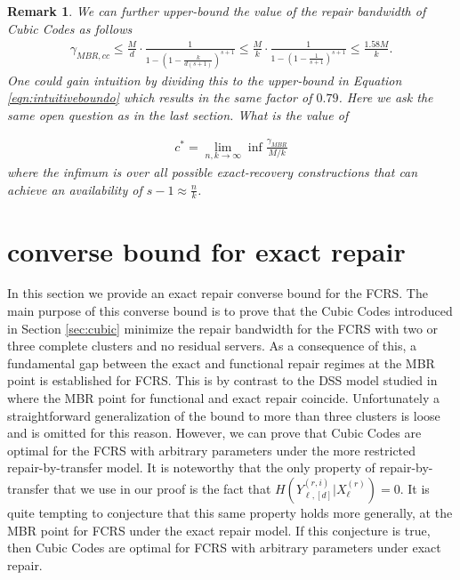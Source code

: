 \documentclass[journal,onecolumn,draftcls]{IEEEtran}
\newtheorem{rem}{Remark}
\begin{document}
\begin{rem}
We can further upper-bound the value of the repair bandwidth of Cubic Codes as follows\begin{eqnarray*}
\gamma_{MBR,cc} \le  \frac{M}{d}\cdot\frac{1}{1 - (1 - \frac{k}{d(s + 1)})^{s + 1}} \le \frac{M}{k}\cdot\frac{1}{1-(1-\frac{1}{s+1})^{s+1}}\le \frac{1.58M}{k}.
\end{eqnarray*}
One could gain intuition by dividing this to the upper-bound in Equation \eqref{eqn:intuitiveboundo} which results in the same factor of $0.79$. Here we ask the same open question as in the last section. What is the value of 

\begin{eqnarray*}
c^* = \lim_{n,k\rightarrow \infty}\inf  \frac{\gamma_{MBR}}{M/k}
\end{eqnarray*} 
where the infimum is over all possible exact-recovery constructions that can achieve an availability of $s -1 \approx \frac{n}{k}$.
\end{rem}

\section{ converse bound for exact repair}
\label{sec:converse}

In this section we provide an  exact repair converse bound for the FCRS. The main purpose of this converse bound is to prove that the Cubic Codes introduced in Section \ref{sec:cubic} minimize the repair bandwidth for the FCRS with two or three complete clusters and no residual servers. As a consequence of this, a fundamental gap between the exact and functional repair regimes at the MBR point is established for FCRS. This is by contrast to the DSS model studied in \cite{dimakis2010network} where the MBR point for functional and exact repair coincide.
Unfortunately a straightforward generalization of the bound to more than three clusters is loose and is omitted for this reason. However, we can prove that Cubic Codes are optimal for the FCRS with arbitrary parameters under the more restricted repair-by-transfer model. It is noteworthy that the only property of  repair-by-transfer that we use in our proof is the fact that $H( Y^{(r,i)}_{\ell,[d]} | X^{(r)}_\ell ) = 0$. It is quite tempting to conjecture that this same property holds more generally, at the MBR point for FCRS under the exact repair model. If this conjecture is true, then Cubic Codes are optimal for FCRS with arbitrary parameters under  exact repair.
\end{document}
